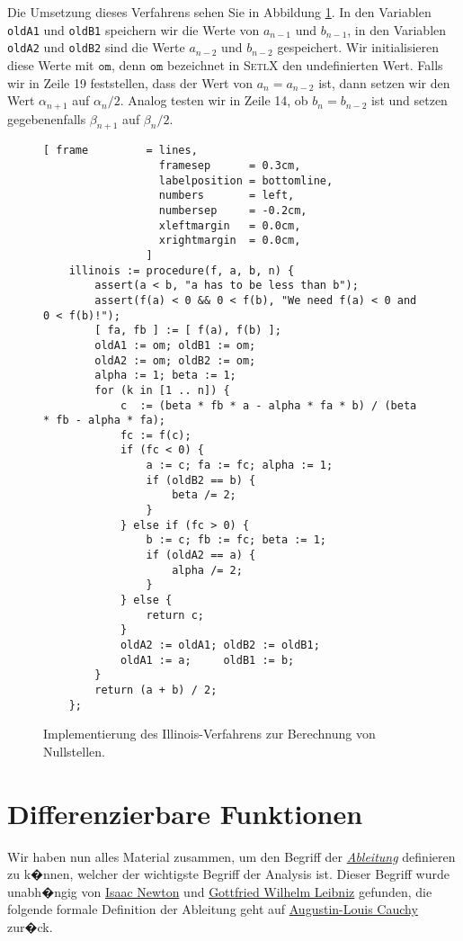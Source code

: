 Die Umsetzung dieses Verfahrens sehen Sie in Abbildung \ref{fig:illinois.stlx}.  In den Variablen
\texttt{oldA1} und \texttt{oldB1} speichern wir die Werte von $a_{n-1}$ und $b_{n-1}$, in den
Variablen \texttt{oldA2} und \texttt{oldB2} sind die Werte $a_{n-2}$ und $b_{n-2}$ gespeichert.  Wir
initialisieren diese Werte mit $\mathtt{om}$, denn $\mathtt{om}$ bezeichnet in \textsc{SetlX}
den undefinierten Wert.
Falls wir in Zeile 19 feststellen, dass der Wert von $a_n = a_{n-2}$ ist, dann setzen wir den Wert
$\alpha_{n+1}$ auf $\alpha_n/2$.  Analog testen wir in Zeile 14, ob $b_n = b_{n-2}$ ist und setzen
gegebenenfalls $\beta_{n+1}$ auf $\beta_n/2$.



\begin{figure}[!ht]
  \centering
\begin{Verbatim}[ frame         = lines, 
                  framesep      = 0.3cm, 
                  labelposition = bottomline,
                  numbers       = left,
                  numbersep     = -0.2cm,
                  xleftmargin   = 0.0cm,
                  xrightmargin  = 0.0cm,
                ]
    illinois := procedure(f, a, b, n) {
        assert(a < b, "a has to be less than b");
        assert(f(a) < 0 && 0 < f(b), "We need f(a) < 0 and 0 < f(b)!");
        [ fa, fb ] := [ f(a), f(b) ];
        oldA1 := om; oldB1 := om;
        oldA2 := om; oldB2 := om;
        alpha := 1; beta := 1;
        for (k in [1 .. n]) {
            c  := (beta * fb * a - alpha * fa * b) / (beta * fb - alpha * fa);
            fc := f(c);
            if (fc < 0) {
                a := c; fa := fc; alpha := 1;
                if (oldB2 == b) {
                    beta /= 2;
                }
            } else if (fc > 0) {
                b := c; fb := fc; beta := 1;
                if (oldA2 == a) {
                    alpha /= 2;
                }
            } else {
                return c;
            }
            oldA2 := oldA1; oldB2 := oldB1;
            oldA1 := a;     oldB1 := b;
        }
        return (a + b) / 2;
    };
\end{Verbatim}
\vspace*{-0.3cm}
  \caption{Implementierung des Illinois-Verfahrens zur Berechnung von Nullstellen.}
  \label{fig:illinois.stlx}
\end{figure} 
\pagebreak

\section{Differenzierbare Funktionen}
Wir haben nun alles Material zusammen, um den Begriff der 
\href{http://de.wikipedia.org/wiki/Differentialrechnung}{\emph{Ableitung}} definieren zu k�nnen, welcher
der wichtigste Begriff der Analysis ist.  Dieser Begriff wurde unabh�ngig von 
\href{http://de.wikipedia.org/wiki/Isaac_Newton}{Isaac Newton} und
\href{http://de.wikipedia.org/wiki/Gottfried_Wilhelm_Leibniz}{Gottfried Wilhelm Leibniz} gefunden,
die folgende formale Definition der Ableitung geht auf 
\href{http://de.wikipedia.org/wiki/Augustin-Louis_Cauchy}{Augustin-Louis Cauchy} zur�ck.

